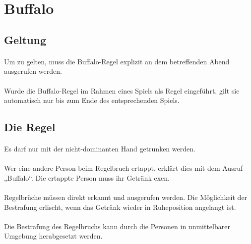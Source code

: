 \section{Buffalo}
\subsection{Geltung}
\paragraph{}
Um zu gelten, muss die Buffalo-Regel explizit an dem betreffenden Abend ausgerufen werden.

\paragraph{}
Wurde die Buffalo-Regel im Rahmen eines Spiels als Regel eingeführt, gilt sie automatisch nur bis zum Ende des entsprechenden Spiels.

\subsection{Die Regel}
\paragraph{}
Es darf nur mit der nicht-dominanten Hand getrunken werden.

\paragraph{}
Wer eine andere Person beim Regelbruch ertappt, erklärt dies mit dem Ausruf „Buffalo“.
Die ertappte Person muss ihr Getränk exen.

\paragraph{}
Regelbrüche müssen direkt erkannt und ausgerufen werden.
Die Möglichkeit der Bestrafung erlischt, wenn das Getränk wieder in Ruheposition angelangt ist.

\paragraph{}
Die Bestrafung des Regelbruchs kann durch die Personen in unmittelbarer Umgebung herabgesetzt werden.